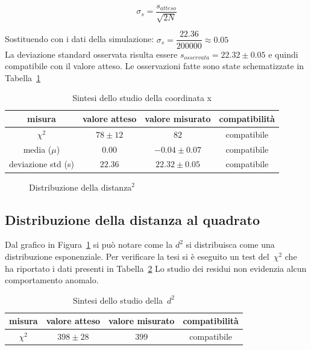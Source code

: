 \documentclass[a4paper,12pt]{article}
\begin{document}
\[ \sigma_s = \dfrac{s_{atteso}}{\sqrt{2N}} \]

Sostituendo con i dati della simulazione: $\sigma_s = \dfrac{22.36}{200000} \approx 0.05$ \\
La deviazione standard osservata risulta essere $s_{osservata} = 22.32 \pm 0.05$ e quindi compatibile con il valore atteso. Le osservazioni fatte sono state schematizzate in Tabella~\ref{tab:sintesi_x}

\begin{table}[h!]
    \centering
    \begin{tabular}{c|c|c|c}
        \toprule
        misura & valore atteso & valore misurato  & compatibilità \\
        \midrule
        $\chi^2$           & $78 \pm 12$   & $82$             & compatibile   \\
        media ($\mu$)      & $0.00$        & $-0.04 \pm 0.07$ & compatibile   \\
        deviazione std (s) & $22.36$       & $22.32 \pm 0.05$ & compatibile   \\
        \bottomrule
    \end{tabular}
    \caption{Sintesi dello studio della coordinata x}%
    \label{tab:sintesi_x}
\end{table}

\begin{figure}
    \centering
    \sffamily
    \resizebox{0.85\textwidth}{!}{%
        
    }
    \caption{Distribuzione della distanza$^2$}%
    \label{fig:distribuzione_d2}
\end{figure}

\subsection{Distribuzione della distanza al quadrato}

Dal grafico in Figura~\ref{fig:distribuzione_d2} si può notare come la $d^2$ si distribuisca come una distribuzione esponenziale. Per verificare la tesi si è eseguito un test del~$\chi^2$ che ha riportato i dati presenti in Tabella~\ref{tab:sintesi_d2}
Lo studio dei residui non evidenzia alcun comportamento anomalo.

\begin{table}[h!]
    \centering
    \begin{tabular}{c|c|c|c}
        \toprule
        misura   & valore atteso & valore misurato  & compatibilità \\
        \midrule
        $\chi^2$ & $398 \pm 28$  & $399$            & compatibile   \\
        \bottomrule
    \end{tabular}
    \caption{Sintesi dello studio della~$d^2$}%
    \label{tab:sintesi_d2}
\end{table}
\end{document}
